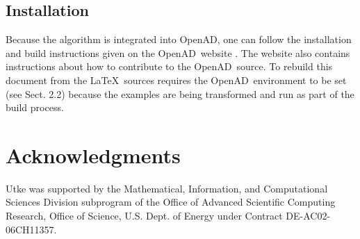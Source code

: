 \documentclass{article}
\newcommand{\openad}{OpenAD}
\begin{document}
\subsection{Installation}
Because the algorithm is integrated into \openad, 
one can follow the installation and build instructions given on the \openad\ website \cite{openadWeb}.
The website also contains instructions about how to contribute to the \openad\ source.
To rebuild this document from the \LaTeX\ sources requires the \openad\ environment to be 
set (see \cite{userManual} Sect. 2.2)  because 
the examples are being transformed and run as part of the build process. 
 
\section*{Acknowledgments}
Utke was supported by the Mathematical, Information, and
Computational Sciences Division subprogram of the Office of Advanced
Scientific Computing Research, Office of Science, U.S. Dept. of Energy under
Contract DE-AC02-06CH11357.  




\vfill
\begin{flushright}
\scriptsize
{}
\normalsize
\end{flushright}
\end{document}
